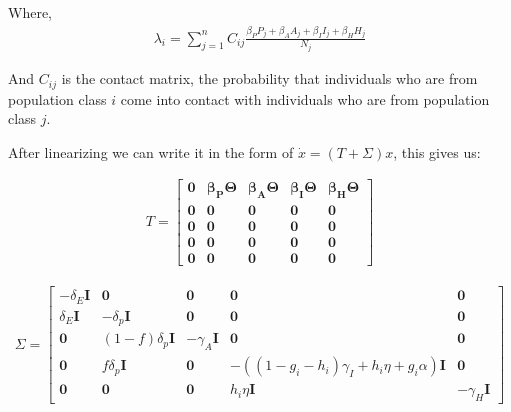 \documentclass{article}
\begin{document}
Where, 
\begin{gather*}
   \lambda_i = \sum_{j = 1}^n C_{ij} \frac{\beta_P P_j + \beta_A A_j + \beta_I I_j + \beta_H H_j}{N_j}
\end{gather*}

And $C_{ij}$ is the contact matrix, the probability that individuals who are from population class $i$ come into contact with individuals who are from population class $j$.

\noindent
After linearizing we can write it in the form of $\dot{x} = (T + \Sigma) x$, this gives us:

\begin{gather}
 T =
  \begin{bmatrix}
   \boldsymbol{0} & \boldsymbol{\beta_P} \boldsymbol{\Theta} & 
   \boldsymbol{\beta_A} \boldsymbol{\Theta} &
   \boldsymbol{\beta_I} \boldsymbol{\Theta} &
   \boldsymbol{\beta_H} \boldsymbol{\Theta} \\
   \boldsymbol{0} & \boldsymbol{0} & \boldsymbol{0} & \boldsymbol{0} & \boldsymbol{0} \\
   \boldsymbol{0} & \boldsymbol{0} & \boldsymbol{0} & \boldsymbol{0} & \boldsymbol{0} \\
   \boldsymbol{0} & \boldsymbol{0} & \boldsymbol{0} & \boldsymbol{0} & \boldsymbol{0} \\
   \boldsymbol{0} & \boldsymbol{0} & \boldsymbol{0} & \boldsymbol{0} & \boldsymbol{0}
   \end{bmatrix}
\end{gather}

\begin{gather}
 \Sigma =
  \begin{bmatrix}
   - \delta_E \boldsymbol{I} & \boldsymbol{0} & \boldsymbol{0} & \boldsymbol{0} & \boldsymbol{0} \\
   \delta_E \boldsymbol{I}& -\delta_p \boldsymbol{I} & \boldsymbol{0} & \boldsymbol{0} & \boldsymbol{0} \\
   \boldsymbol{0} & (1-f) \delta_p \boldsymbol{I} & -\gamma_A \boldsymbol{I} & \boldsymbol{0} & \boldsymbol{0} \\
   \boldsymbol{0} & f \delta_p \boldsymbol{I} & \boldsymbol{0} & - ((1-g_i-h_i) \gamma_{I} + h_i \eta + g_i \alpha) \boldsymbol{I} & \boldsymbol{0} \\
   \boldsymbol{0} & \boldsymbol{0} & \boldsymbol{0} & h_i \eta \boldsymbol{I} & -\gamma_H \boldsymbol{I}
   \end{bmatrix}
\end{gather}
\end{document}
